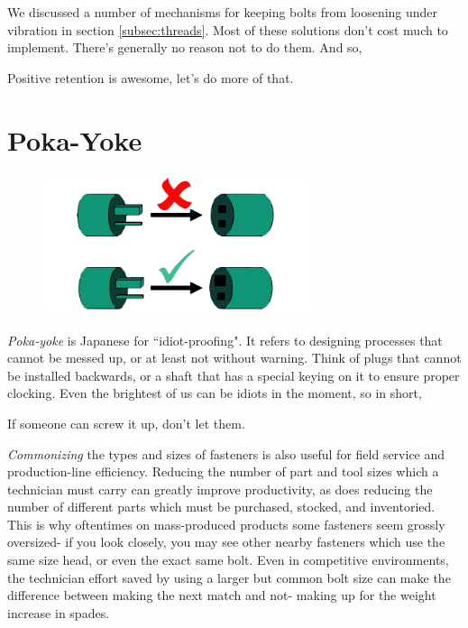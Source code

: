 We discussed a number of mechanisms for keeping bolts from loosening under vibration in section \ref{subsec:threads}. Most of these solutions don't cost much to implement. There's generally no reason not to do them. And so,

\begin{theorem}
Positive retention is awesome, let's do more of that.
\end{theorem}

\section{Poka-Yoke}

\begin{figure}[H]
	\includegraphics[width=0.7\textwidth]{imgs/poka_yoke.png}
\end{figure}

\textit{Poka-yoke} is Japanese for ``idiot-proofing". It refers to designing processes that cannot be messed up, or at least not without warning. Think of plugs that cannot be installed backwards, or a shaft that has a special keying on it to ensure proper clocking. Even the brightest of us can be idiots in the moment, so in short,

\begin{theorem}
If someone can screw it up, don't let them.
\end{theorem}	

\textit{Commonizing} the types and sizes of fasteners is also useful for field service and production-line efficiency. Reducing the number of part and tool sizes which a technician must carry can greatly improve productivity, as does reducing the number of different parts which must be purchased, stocked, and inventoried. This is why oftentimes on mass-produced products some fasteners seem grossly oversized- if you look closely, you may see other nearby fasteners which use the same size head, or even the exact same bolt. Even in competitive environments, the technician effort saved by using a larger but common bolt size can make the difference between making the next match and not- making up for the weight increase in spades.


